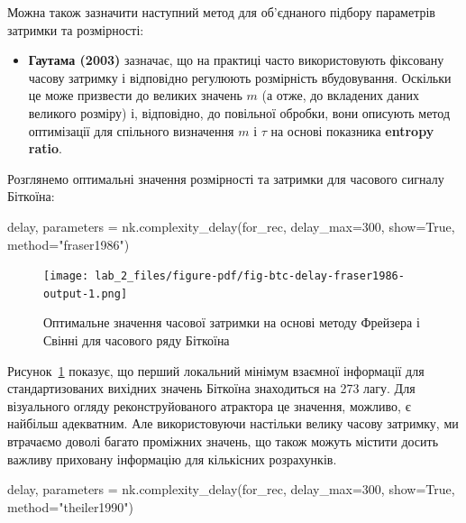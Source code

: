\documentclass[
  letterpaper,
]{report}
\newenvironment{Shaded}{\begin{snugshade}}{\end{snugshade}}
\newcommand{\DecValTok}[1]{\textcolor[rgb]{0.68,0.00,0.00}{#1}}
\newcommand{\NormalTok}[1]{\textcolor[rgb]{0.00,0.23,0.31}{#1}}
\newcommand{\OperatorTok}[1]{\textcolor[rgb]{0.37,0.37,0.37}{#1}}
\newcommand{\StringTok}[1]{\textcolor[rgb]{0.13,0.47,0.30}{#1}}
\newcommand{\VariableTok}[1]{\textcolor[rgb]{0.07,0.07,0.07}{#1}}
\providecommand{\tightlist}{%
  \setlength{\itemsep}{0pt}\setlength{\parskip}{0pt}}\usepackage{longtable,booktabs,array}
\begin{document}
Можна також зазначити наступний метод для об'єднаного підбору параметрів
затримки та розмірності:

\begin{itemize}
\tightlist
\item
  \textbf{Гаутама (2003)} зазначає, що на практиці часто використовують
  фіксовану часову затримку і відповідно регулюють розмірність
  вбудовування. Оскільки це може призвести до великих значень \(m\) (а
  отже, до вкладених даних великого розміру) і, відповідно, до повільної
  обробки, вони описують метод оптимізації для спільного визначення
  \(m\) і \(\tau\) на основі показника \textbf{entropy ratio}.
\end{itemize}

Розглянемо оптимальні значення розмірності та затримки для часового
сигналу Біткоїна:

\begin{Shaded}
\begin{Highlighting}[]
\NormalTok{delay, parameters }\OperatorTok{=}\NormalTok{ nk.complexity\_delay(for\_rec, }
\NormalTok{                                        delay\_max}\OperatorTok{=}\DecValTok{300}\NormalTok{, show}\OperatorTok{=}\VariableTok{True}\NormalTok{,}
\NormalTok{                                        method}\OperatorTok{=}\StringTok{"fraser1986"}\NormalTok{)}
\end{Highlighting}
\end{Shaded}

\begin{figure}[H]

{\centering \texttt{[image: lab\_2\_files/figure-pdf/fig-btc-delay-fraser1986-output-1.png]}

}

\caption{\label{fig-btc-delay-fraser1986}Оптимальне значення часової
затримки на основі методу Фрейзера і Свінні для часового ряду Біткоїна}

\end{figure}

Рисунок~\ref{fig-btc-delay-fraser1986} показує, що перший локальний
мінімум взаємної інформації для стандартизованих вихідних значень
Біткоїна знаходиться на 273 лагу. Для візуального огляду
реконструйованого атрактора це значення, можливо, є найбільш адекватним.
Але використовуючи настільки велику часову затримку, ми втрачаємо доволі
багато проміжних значень, що також можуть містити досить важливу
приховану інформацію для кількісних розрахунків.

\begin{Shaded}
\begin{Highlighting}[]
\NormalTok{delay, parameters }\OperatorTok{=}\NormalTok{ nk.complexity\_delay(for\_rec, }
\NormalTok{                                        delay\_max}\OperatorTok{=}\DecValTok{300}\NormalTok{, show}\OperatorTok{=}\VariableTok{True}\NormalTok{,}
\NormalTok{                                        method}\OperatorTok{=}\StringTok{"theiler1990"}\NormalTok{)}
\end{Highlighting}
\end{Shaded}
\end{document}
